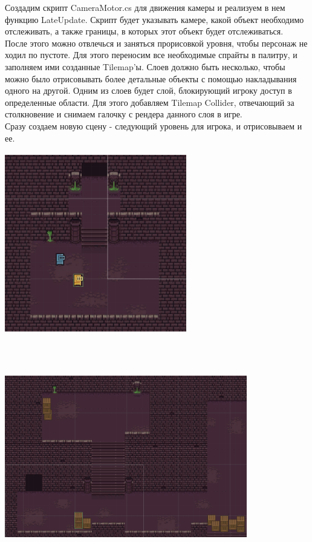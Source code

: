 \documentclass[a4paper,12pt]{article}
\begin{document}
Создадим скрипт CameraMotor.cs для движения камеры и реализуем в нем функцию LateUpdate. Скрипт будет указывать камере, какой объект необходимо отслеживать, а также границы, в которых этот объект будет отслеживаться. \\
После этого можно отвлечься и заняться прорисовкой уровня, чтобы персонаж не ходил по пустоте. Для этого переносим все необходимые спрайты в палитру, и заполняем ими созданные Tilemap'ы. Слоев должно быть несколько, чтобы можно было отрисовывать более детальные объекты с помощью накладывания одного на другой. Одним из слоев будет слой, блокирующий игроку доступ в определенные области. Для этого добавляем Tilemap Collider, отвечающий за столкновение и снимаем галочку с рендера данного слоя в игре. \\
Сразу создаем новую сцену - следующий уровень для игрока, и отрисовываем и ее. \\
\centerline{\includegraphics[width = 300px, height=300px]{pictures/level1.png}} \\
\vspace{2mm}
\centerline{\includegraphics[width = 400px, height=300px]{pictures/level2.png}}
\end{document}
